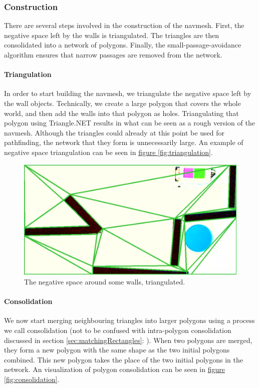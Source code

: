 \documentclass[10pt, abstracton, twocolumn]{scrartcl}
\newcommand{\fref}[1]{\hyperref[#1]{figure \vref{#1}}}
\newcommand{\sref}[1]{section \vref{#1}: \nameref{#1}}
\begin{document}
\subsubsection{Construction}
There are several steps involved in the construction of the navmesh. First, the negative space left by the walls is triangulated. The triangles are then consolidated into a network of polygons. Finally, the small-passage-avoidance algorithm ensures that narrow passages are removed from the network.

\paragraph{Triangulation}
In order to start building the navmesh, we triangulate the negative space left by the wall objects. Technically, we create a large polygon that covers the whole world, and then add the walls into that polygon as holes. Triangulating that polygon using Triangle.NET results in what can be seen as a rough version of the navmesh. Although the triangles could already at this point be used for pathfinding, the network that they form is unnecessarily large. An example of negative space triangulation can be seen in \fref{fig:triangulation}.

\begin{figure}[h]
        \centering
        \includegraphics[width=\columnwidth]{pictures/triangulation.png}
        \caption{\small The negative space around some walls, triangulated.}
        \label{fig:triangulation}
\end{figure}

\paragraph{Consolidation}
We now start merging neighbouring triangles into larger polygons using a process we call consolidation (not to be confused with intra-polygon consolidation discussed in \sref{sec:matchingRectangles}). When two polygons are merged, they form a new polygon with the same shape as the two initial polygons combined. This new polygon takes the place of the two initial polygons in the network. An visualization of polygon consolidation can be seen in \fref{fig:consolidation}.
\end{document}
